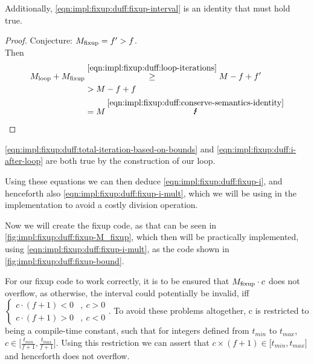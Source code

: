 Additionally, \cref{eqn:impl:fixup:duff:fixup-interval} is an identity that must hold true.
\begin{proof}\label{proof:impl:fixup:duff:fixup-interval}
    Conjecture: $M_{\text{fixup}} = f' > f$.\\
    Then
    \begin{align*}
        \Mloop + \Mfixup &\overset{\ref{eqn:impl:fixup:duff:loop-iterations}}{\geq} M - f + f' \\
        &> M - f + f \\
        &= M \medspace \overset{\ref{eqn:impl:fixup:duff:conserve-semantics-identity}}{\mLightning}
    \end{align*}
\end{proof}

\cref{eqn:impl:fixup:duff:total-iteration-based-on-bounds} and \cref{eqn:impl:fixup:duff:i-after-loop} are both true by the construction of our loop.

Using these equations we can then deduce \cref{eqn:impl:fixup:duff:fixup-i}, and henceforth also \cref{eqn:impl:fixup:duff:fixup-i-mult}, which we will be using in the implementation to avoid a costly division operation.

Now we will create the fixup code, as that can be seen in \cref{fig:impl:fixup:duff:fixup-M_fixup}, which then will be practically implemented, using \cref{eqn:impl:fixup:duff:fixup-i-mult}, as the code shown in \cref{fig:impl:fixup:duff:fixup-bound}.





For our fixup code to work correctly, it is to be ensured that $M_{\text{fixup}} \cdot c$ does not overflow, as otherwise, the interval \cinterval could potentially be invalid, iff $
\begin{cases}
    c \cdot (f + 1) < 0 &, \medspace c > 0\\
    c \cdot (f + 1) > 0 &, \medspace c < 0
\end{cases}$.
To avoid these problems altogether, c is restricted to being a compile-time constant, such that for integers defined from $t_{min}$ to $t_{max}$, $c \in \lbrack \frac{t_{min}}{f + 1}, \frac{t_{max}}{f + 1} \rbrack$.
Using this restriction we can assert that $c \times (f + 1) \in \lbrack t_{min}, t_{max} \rbrack$ and henceforth does not overflow.

